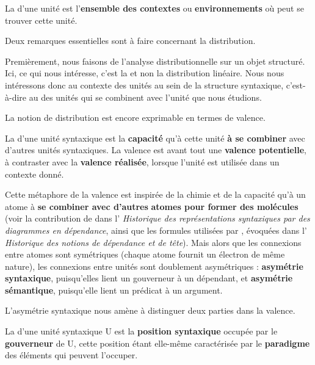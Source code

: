 \begin{styleLivreImportant}
La  d’une unité est l’\textbf{ensemble des contextes} ou \textbf{environnements} où peut se trouver cette unité.
\end{styleLivreImportant}

Deux remarques essentielles sont à faire concernant la distribution.

Premièrement, nous faisons de l’analyse distributionnelle sur un objet structuré. Ici, ce qui nous intéresse, c’est la  et non la distribution linéaire. Nous nous intéressons donc au contexte des unités au sein de la structure syntaxique, c’est-à-dire au  des unités qui se combinent avec l’unité que nous étudions.

La notion de distribution est encore exprimable en termes de valence.

\begin{styleLivreImportant}
La  d’une unité syntaxique est la \textbf{capacité} qu’à cette unité \textbf{à se combiner} avec d’autres unités syntaxiques. La valence est avant tout une \textbf{valence potentielle}, à contraster avec la \textbf{valence réalisée}, lorsque l’unité est utilisée dans un contexte donné.
\end{styleLivreImportant}

Cette métaphore de la valence est inspirée de la chimie et de la capacité qu’à un atome à \textbf{se combiner avec d’autres} \textbf{atomes pour former des molécules} (voir la contribution de \citet{Peirce1897} dans l’ \textit{Historique des représentations syntaxiques par des diagrammes en dépendance}, ainsi que les formules utilisées par \citet{Jespersen1937}, évoquées dans l’ \textit{Historique des notions de dépendance et de tête}). Mais alors que les connexions entre atomes sont symétriques (chaque atome fournit un électron de même nature), les connexions entre unités sont doublement asymétriques : \textbf{asymétrie syntaxique}, puisqu’elles lient un gouverneur à un dépendant, et \textbf{asymétrie sémantique}, puisqu’elle lient un prédicat à un argument.

L’asymétrie syntaxique nous amène à distinguer deux parties dans la valence.

\begin{styleLivreImportant}
La  d’une unité syntaxique U est la \textbf{position syntaxique} occupée par le \textbf{gouverneur} de U, cette position étant elle-même caractérisée par le \textbf{paradigme} des éléments qui peuvent l’occuper.
\end{styleLivreImportant}

